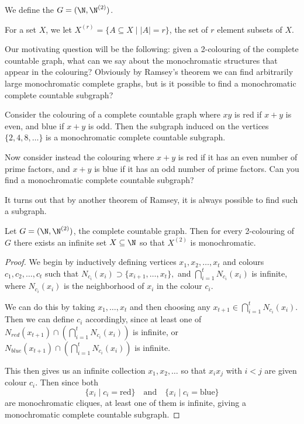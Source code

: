 \documentclass[a4paper]{scrartcl}
\begin{document}
\begin{definition}
	We define the  $G = (\N, \N^{(2)})$.
\end{definition}

\begin{notation}
	For a set $X$, we let $X^{(r)} = \{A \subseteq X \mid |A| = r\}$, the set of $r$ element subsets of $X$.
\end{notation}

Our motivating question will be the following: given a 2-colouring of the complete countable graph, what can we say about the monochromatic structures that appear in the colouring? Obviously by Ramsey's theorem we can find arbitrarily large monochromatic complete graphs, but is it possible to find a monochromatic complete countable subgraph?

\begin{example}
	Consider the colouring of a complete countable graph where $xy$ is red if $x + y$ is even, and blue if $x + y$ is odd.
	Then the subgraph induced on the vertices $\{2, 4, 8, \dots\}$ is a monochromatic complete countable subgraph.

	Now consider instead the colouring where $x + y$ is red if it has an even number of prime factors, and $x + y$ is blue if it has an odd number of prime factors. Can you find a monochromatic complete countable subgraph?
\end{example}

It turns out that by another theorem of Ramsey, it is always possible to find such a subgraph.

\begin{theorem}
	Let $G= (\N, \N^{(2)})$, the complete countable graph. Then for every 2-colouring of $G$ there exists an infinite set $X \subseteq \N$ so that $X^{(2)}$ is monochromatic.
\end{theorem}
\begin{proof}
	We begin by inductively defining vertices $x_1, x_2, \dots, x_t$ and colours $c_1, c_2, \dots, c_t$ such that 
	$N_{c_i}(x_i) \supset \{x_{i + 1}, \dots, x_{t}\},$
	and
	$
	\bigcap_{i = 1}^t N_{c_i}(x_i)
	$ is infinite, where $N_{c_i}(x_i)$ is the neighborhood of $x_i$ in the colour $c_i$.

	We can do this by taking $x_1, \dots, x_t$ and then choosing any $x_{t + 1} \in \bigcap_{i = 1}^t N_{c_i}(x_i)$. Then we can define $c_i$ accordingly, since at least one of $N_{red}(x_{t + 1}) \cap \left(\bigcap_{i = 1}^t N_{c_i}(x_i)\right)$ is infinite, or $N_{blue}(x_{t + 1}) \cap \left(\bigcap_{i = 1}^t N_{c_i}(x_i)\right)$ is infinite.

	This then gives us an infinite collection $x_1, x_2, \dots$ so that $x_i x_j$ with $i < j$ are given colour $c_i$. Then since both
	$$
	\{x_i \mid c_i = \text{red}\} \quad \text{and} \quad \{x_i \mid c_i = \text{blue}\}
	$$
	are monochromatic cliques, at least one of them is infinite, giving a monochromatic complete countable subgraph.
\end{proof}
\end{document}
